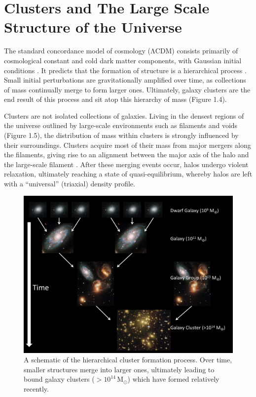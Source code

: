 \section[Clusters and Environment]{Clusters and The Large Scale Structure of the Universe}

The standard concordance model of cosmology ($\mathrm{\Lambda}$CDM) consists primarily of cosmological constant and cold dark matter components, with Gaussian initial conditions \citep{Planck2015}. It predicts that the formation of structure is a hierarchical process \citep{WH91.1,KA93.1,LA93.1}. Small initial perturbations are gravitationally amplified over time, as collections of mass continually merge to form larger ones. Ultimately, galaxy clusters are the end result of this process and sit atop this hierarchy of mass (Figure 1.4).

Clusters are not isolated collections of galaxies. Living in the densest regions of the universe outlined by large-scale environments such as filaments and voids (Figure 1.5), the distribution of mass within clusters is strongly influenced by their surroundings.  Clusters acquire most of their mass from major mergers along the filaments, giving rise to an alignment between the major axis of the halo and the large-scale filament \citep{BailinSteinmetz2005,AL06.2,PA06.1,AR07.1,BR07.1}. After these merging events occur, halos undergo violent relaxation, ultimately reaching a state of quasi-equilibrium, whereby halos are left with a ``universal'' (triaxial) density profile.

\begin{figure}
  \centering
  \includegraphics[width=\textwidth]{images/Introduction/ClusterFormation.pdf}
  \caption[Cluster Formation]{A schematic of the hierarchical cluster formation process. Over time, smaller structures merge into larger ones, ultimately leading to bound galaxy clusters ($\mathrm{>10^{14}\,M_{\odot}}$) which have formed relatively recently.}
\end{figure}


